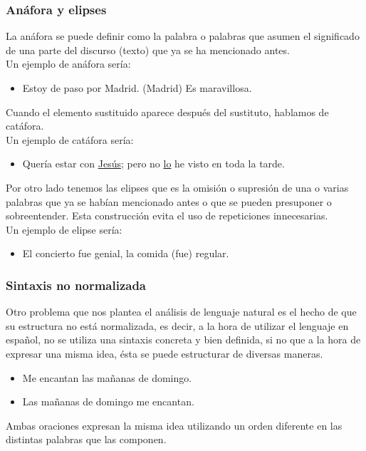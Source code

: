 \documentclass[../all.tex]{subfiles}
\begin{document}
\subsubsection{Anáfora y elipses}
	La anáfora se puede definir como la palabra o palabras que asumen el significado de una parte del discurso (texto) que ya se ha mencionado antes\cite{AnaforaElipses}.\\
	
	Un ejemplo de anáfora sería:
	\begin{itemize}[resume]
		\item Estoy de paso por Madrid. {\small(Madrid)} Es maravillosa. 
	\end{itemize}
	Cuando el elemento sustituido aparece después del sustituto, hablamos de catáfora.\\
	Un ejemplo de catáfora sería:
	\begin{itemize}[resume]
		\item Quería estar con \underline{Jesús}; pero no \underline{lo} he visto en toda la tarde. 
	\end{itemize}

	Por otro lado tenemos las elipses que es la omisión o supresión de una o varias palabras que ya se habían mencionado antes o que se pueden presuponer o sobreentender. Esta construcción evita el uso de repeticiones innecesarias.\\
	Un ejemplo de elipse sería:
	\begin{itemize}[resume]
		\item El concierto fue genial, la comida {\small(fue)} regular. 
	\end{itemize}
\subsubsection{Sintaxis no normalizada}
	 Otro problema que nos plantea el análisis de lenguaje natural es el hecho de que su estructura no está normalizada, es decir, a la hora de utilizar el lenguaje en español, no se utiliza una sintaxis concreta y bien definida, si no que a la hora de expresar una misma idea, ésta se puede estructurar de diversas maneras.
 	\begin{itemize}[resume]
	 	\item Me encantan las mañanas de domingo.
	 	\item Las mañanas de domingo me encantan.
 	\end{itemize}
	 Ambas oraciones expresan la misma idea utilizando un orden diferente en las distintas palabras que las componen.
\newpage
\end{document}
